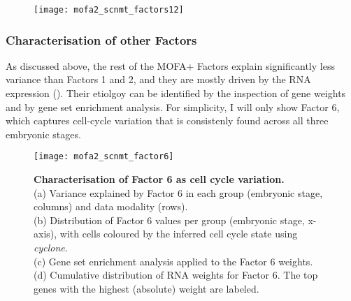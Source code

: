 \begin{figure}[H]
	\centering
	\texttt{[image: mofa2\_scnmt\_factors12]}
	\caption[]{
	}
	\label{fig:mofa2_scnmt_factors12}
\end{figure}

\subsubsection{Characterisation of other Factors}

As discussed above, the rest of the MOFA+ Factors explain significantly less variance than Factors 1 and 2, and they are mostly driven by the RNA expression (). Their etiolgoy can be identified by the inspection of gene weights and by gene set enrichment analysis. For simplicity, I will only show Factor 6, which captures cell-cycle variation that is consistenly found across all three embryonic stages.

\begin{figure}[H]
	\centering
	\texttt{[image: mofa2\_scnmt\_factor6]}
	\caption[]{
	\textbf{Characterisation of Factor 6 as cell cycle variation.} \\
	(a) Variance explained by Factor 6 in each group (embryonic stage, columns) and data modality (rows).\\
	(b) Distribution of Factor 6 values per group (embryonic stage, x-axis), with cells coloured by the inferred cell cycle state using \textit{cyclone}.\\
	(c) Gene set enrichment analysis applied to the Factor 6 weights.\\
	(d) Cumulative distribution of RNA weights for Factor 6. The top genes with the highest (absolute) weight are labeled.
	}
	\label{fig:mofa2_scnmt_factor6}
\end{figure}

